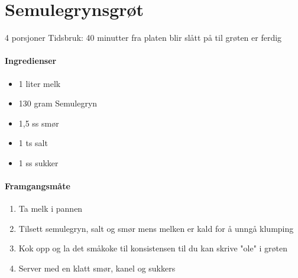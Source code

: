 \section{﻿Semulegrynsgrøt}
4 porsjoner
Tidsbruk: 40 minutter fra platen blir slått på til grøten er  ferdig

\paragraph{Ingredienser}
\begin{itemize}[noitemsep]
	\item 1 liter melk
	\item 130 gram Semulegryn
	\item 1,5 ss smør
	\item 1 ts salt
	\item 1 ss sukker
\end{itemize}

\paragraph{Framgangsmåte}
\begin{enumerate}[noitemsep]
	\item Ta melk i pannen
	\item Tilsett semulegryn, salt og smør mens melken er kald for å unngå klumping
	\item Kok opp og la det småkoke til konsistensen til du kan skrive "ole" i grøten
	\item Server med en klatt smør, kanel og sukkers
\end{enumerate}
